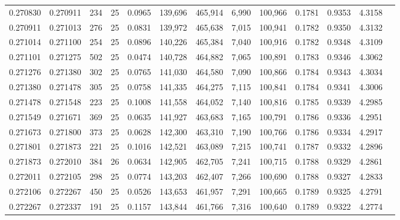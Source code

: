 \begin{tabular}{rrrrrrrrrrrrr}
0.270830 & 0.270911 &   234 &  25 &                                     0.0965 & 139,696 & 465,914 &   6,990 & 100,966 & 0.1781 & 0.9353 & 4.3158 \\
0.270911 & 0.271013 &   276 &  25 &                                     0.0831 & 139,972 & 465,638 &   7,015 & 100,941 & 0.1782 & 0.9350 & 4.3132 \\
0.271014 & 0.271100 &   254 &  25 &                                     0.0896 & 140,226 & 465,384 &   7,040 & 100,916 & 0.1782 & 0.9348 & 4.3109 \\
0.271101 & 0.271275 &   502 &  25 &                                     0.0474 & 140,728 & 464,882 &   7,065 & 100,891 & 0.1783 & 0.9346 & 4.3062 \\
0.271276 & 0.271380 &   302 &  25 &                                     0.0765 & 141,030 & 464,580 &   7,090 & 100,866 & 0.1784 & 0.9343 & 4.3034 \\
0.271380 & 0.271478 &   305 &  25 &                                     0.0758 & 141,335 & 464,275 &   7,115 & 100,841 & 0.1784 & 0.9341 & 4.3006 \\
0.271478 & 0.271548 &   223 &  25 &                                     0.1008 & 141,558 & 464,052 &   7,140 & 100,816 & 0.1785 & 0.9339 & 4.2985 \\
0.271549 & 0.271671 &   369 &  25 &                                     0.0635 & 141,927 & 463,683 &   7,165 & 100,791 & 0.1786 & 0.9336 & 4.2951 \\
0.271673 & 0.271800 &   373 &  25 &                                     0.0628 & 142,300 & 463,310 &   7,190 & 100,766 & 0.1786 & 0.9334 & 4.2917 \\
0.271801 & 0.271873 &   221 &  25 &                                     0.1016 & 142,521 & 463,089 &   7,215 & 100,741 & 0.1787 & 0.9332 & 4.2896 \\
0.271873 & 0.272010 &   384 &  26 &                                     0.0634 & 142,905 & 462,705 &   7,241 & 100,715 & 0.1788 & 0.9329 & 4.2861 \\
0.272011 & 0.272105 &   298 &  25 &                                     0.0774 & 143,203 & 462,407 &   7,266 & 100,690 & 0.1788 & 0.9327 & 4.2833 \\
0.272106 & 0.272267 &   450 &  25 &                                     0.0526 & 143,653 & 461,957 &   7,291 & 100,665 & 0.1789 & 0.9325 & 4.2791 \\
0.272267 & 0.272337 &   191 &  25 &                                     0.1157 & 143,844 & 461,766 &   7,316 & 100,640 & 0.1789 & 0.9322 & 4.2774 \\

\end{tabular}
